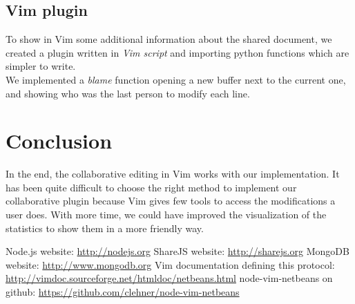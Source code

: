 \documentclass{llncs}
\begin{document}
\subsection{Vim plugin}

To show in Vim some additional information about the shared document, we
created a plugin written in \textit{Vim script} and importing python functions
which are simpler to write.\\
We implemented a \textit{blame} function opening a new buffer next to the
current one, and showing who was the last person to modify each line.

\section{Conclusion}\label{sec:Conclusion}

In the end, the collaborative editing in Vim works with our implementation.
It has been quite difficult to choose the right method to implement our collaborative plugin
because Vim gives few tools to access the modifications a user does. With more time,
we could have improved the visualization of the statistics to show them in a more friendly way.

\begin{thebibliography}{1}

Node.js website: \url{http://nodejs.org}
ShareJS website: \url{http://sharejs.org}
MongoDB website: \url{http://www.mongodb.org}
Vim documentation defining this protocol: \url{http://vimdoc.sourceforge.net/htmldoc/netbeans.html}
node-vim-netbeans on github: \url{https://github.com/clehner/node-vim-netbeans}

\end{thebibliography}
\end{document}

